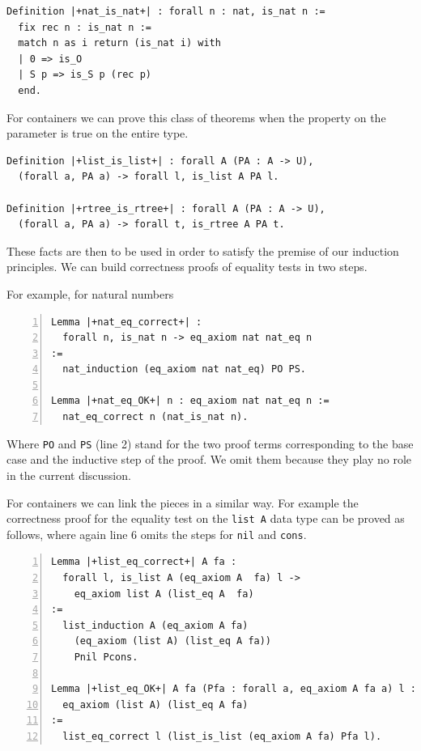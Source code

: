 \documentclass[sigplan,10pt,review]{acmart}\settopmatter{printfolios=true,printccs=false,printacmref=false}
\begin{document}
\begin{minipage}{\textwidth}\begin{lstlisting}
Definition |+nat_is_nat+| : forall n : nat, is_nat n :=
  fix rec n : is_nat n :=
  match n as i return (is_nat i) with
  | 0 => is_O
  | S p => is_S p (rec p)
  end.
\end{lstlisting}\end{minipage}

\noindent
For containers we can prove this class of theorems
when the property on the
parameter is true on the entire type.

\begin{minipage}{\textwidth}\begin{lstlisting}
Definition |+list_is_list+| : forall A (PA : A -> U),
  (forall a, PA a) -> forall l, is_list A PA l.

Definition |+rtree_is_rtree+| : forall A (PA : A -> U),
  (forall a, PA a) -> forall t, is_rtree A PA t.
\end{lstlisting}\end{minipage}

\noindent
These facts are then to be used in order to satisfy the
premise of our induction principles. We can build correctness
proofs of equality tests in two steps.

For example, for natural numbers

\begin{minipage}{\textwidth}\begin{lstlisting}[numbers=left]
Lemma |+nat_eq_correct+| :
  forall n, is_nat n -> eq_axiom nat nat_eq n
:=
  nat_induction (eq_axiom nat nat_eq) PO PS.

Lemma |+nat_eq_OK+| n : eq_axiom nat nat_eq n :=
  nat_eq_correct n (nat_is_nat n).
\end{lstlisting}\end{minipage}

\noindent
Where \lstinline+PO+ and \lstinline+PS+ (line 2) stand for
the two proof terms corresponding to the base case and the inductive
step of the proof. We omit them because they play no role in the
current discussion.

For containers we can link the pieces in a similar way.
For example the correctness proof
for the equality test on the \lstinline+list A+ data type can be
proved as follows, where again line 6 omits the steps for
\lstinline+nil+ and \lstinline+cons+.

\begin{minipage}{\textwidth}\begin{lstlisting}[numbers=left]
Lemma |+list_eq_correct+| A fa :
  forall l, is_list A (eq_axiom A  fa) l ->
    eq_axiom list A (list_eq A  fa)
:=
  list_induction A (eq_axiom A fa)
    (eq_axiom (list A) (list_eq A fa))
    Pnil Pcons.

Lemma |+list_eq_OK+| A fa (Pfa : forall a, eq_axiom A fa a) l :
  eq_axiom (list A) (list_eq A fa)
:=
  list_eq_correct l (list_is_list (eq_axiom A fa) Pfa l).
\end{lstlisting}\end{minipage}
\end{document}
